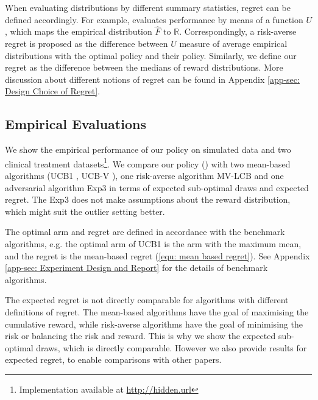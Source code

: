 When evaluating distributions by different summary statistics, regret can be defined accordingly. For example,  \textcite{cassel_general_2018} evaluates performance by means of a function $U$, which maps the empirical distribution $\hat{F} \text { to } \mathbb{R}$. Correspondingly, a risk-averse regret is proposed as the difference between $U$ measure of average empirical distributions with the optimal policy and their policy. Similarly, we define our regret as the difference between the medians of reward distributions.
More discussion about different notions of regret can be found in Appendix \ref{app-sec: Design Choice of Regret}.


\subsection{Empirical Evaluations}
\label{sec: Empirical Experiments}

We show the empirical performance of our policy on simulated data and two clinical treatment datasets\footnote{Implementation available at \url{http://hidden.url}}.
We compare our policy (\ourpolicy) with two mean-based algorithms (UCB1 \cite{Auer2002}, UCB-V \cite{audibert2009exploration}), one risk-averse algorithm MV-LCB \cite{sani_risk-aversion_2012} and one adversarial algorithm Exp3 \cite{Auer2003adv} in terms of expected sub-optimal draws and expected regret.
The Exp3 does not make assumptions about the reward distribution,
which might suit the outlier setting better.

The optimal arm and regret are defined in accordance with the benchmark algorithms,
e.g. the optimal arm of UCB1 is the arm with the maximum mean,
and the regret is the mean-based regret (\ref{equ: mean based regret}).
See Appendix \ref{app-sec: Experiment Design and Report} for the details of benchmark algorithms.

The expected regret is not directly comparable for algorithms with different definitions of regret. The mean-based algorithms have the goal of maximising the cumulative reward, while risk-averse algorithms have the goal of minimising the risk or balancing the risk and reward.
This is why we show the expected sub-optimal draws, which is directly comparable. However
we also provide results for expected regret, to enable comparisons with other papers.

